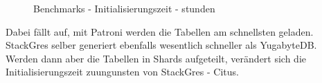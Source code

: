 \begin{flushleft}
\begin{figure}[H]
        \caption{Benchmarks - Initialisierungszeit - stunden}
        \label{fig:initializing_time_hour}
    \end{figure}
    Dabei fällt auf, mit Patroni werden die Tabellen am schnellsten geladen.\\
    StackGres selber generiert ebenfalls wesentlich schneller als YugabyteDB.\\
    Werden dann aber die Tabellen in Shards aufgeteilt, verändert sich die Initialisierungszeit zuungunsten von StackGres - Citus.


\end{flushleft}
